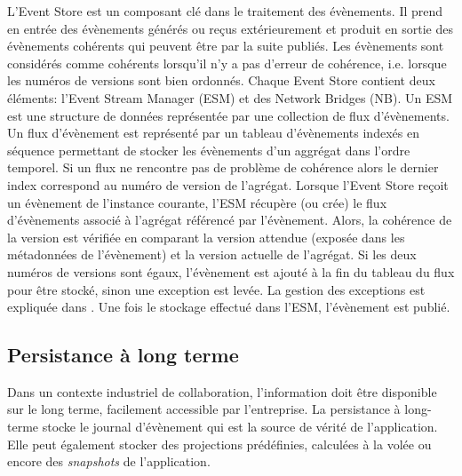L'Event Store est un composant clé dans le traitement des évènements. Il prend 
en entrée des évènements générés ou reçus extérieurement et produit en sortie 
des évènements cohérents qui peuvent être par la suite publiés. Les évènements 
sont considérés comme cohérents lorsqu'il n'y a pas d'erreur de cohérence, i.e. 
lorsque les numéros de versions sont bien ordonnés. Chaque Event Store contient 
deux éléments: l'Event Stream Manager (ESM) et des Network Bridges (NB). Un
ESM est une structure de données représentée par une collection de flux 
d'évènements. Un flux d'évènement est représenté par un tableau d'évènements 
indexés en séquence permettant de stocker les évènements d'un aggrégat dans 
l'ordre temporel. Si un flux ne rencontre pas de problème de cohérence alors le 
dernier index correspond au numéro de version de l'agrégat. Lorsque l'Event Store 
reçoit un évènement de l'instance courante, l'ESM récupère (ou crée) le flux d'évènements associé à l'agrégat 
référencé par l'évènement. Alors, la cohérence de la version est vérifiée en 
comparant la version attendue (exposée dans les métadonnées de l'évènement) 
et la version actuelle de l'agrégat. Si les deux numéros de versions sont égaux, 
l'évènement est ajouté à la fin du tableau du flux pour être stocké, sinon une 
exception est levée. La gestion des exceptions est expliquée dans . Une fois le stockage effectué dans l'ESM, l'évènement est publié.



\subsection{Persistance à long terme}\label{sec:persistance-a-long-terme}
Dans un contexte industriel de collaboration, l'information doit être disponible sur le long terme, facilement accessible par l'entreprise. La persistance à 
long-terme stocke le journal d'évènement qui est la 
source de vérité de l'application. Elle peut également stocker des projections 
prédéfinies, calculées à la volée ou encore des \textit{snapshots} de l'application.

